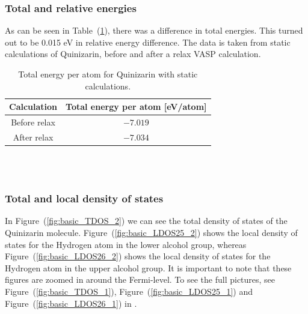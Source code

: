 \documentclass{article}
\begin{document}
      \vspace{1cm}

    \subsubsection{Total and relative energies}

      As can be seen in Table~(\ref{tab:TOTENquinizarin}), there was a difference in total energies. This turned out to be 0.015 eV in relative energy difference. The data is taken from static calculations of Quinizarin, before and after a relax VASP calculation. \\

      \begin{table}[H]
        \centering
        \caption{Total energy per atom for Quinizarin with static calculations. }
        \label{tab:TOTENquinizarin}
        \begin{tabular}{|c|c|}
            \hline
            Calculation & Total energy per atom [eV/atom]  \\
            \hline \hline
            Before relax & $-7.019$ \\
            After relax & $-7.034$ \\
            \hline
        \end{tabular} \\
        \hspace{0pt}\\
    \end{table}

      \vspace{1cm}

    \subsubsection{Total and local density of states}

      In Figure~(\ref{fig:basic_TDOS_2}) we can see the total density of states of the Quinizarin molecule. Figure~(\ref{fig:basic_LDOS25_2}) shows the local density of states for the Hydrogen atom in the lower alcohol group, whereas Figure~(\ref{fig:basic_LDOS26_2}) shows the local density of states for the Hydrogen atom in the upper alcohol group. It is important to note that these figures are zoomed in around the Fermi-level.
      To see the full pictures, see Figure~(\ref{fig:basic_TDOS_1}), Figure~(\ref{fig:basic_LDOS25_1}) and Figure~(\ref{fig:basic_LDOS26_1}) in . \\
\end{document}
